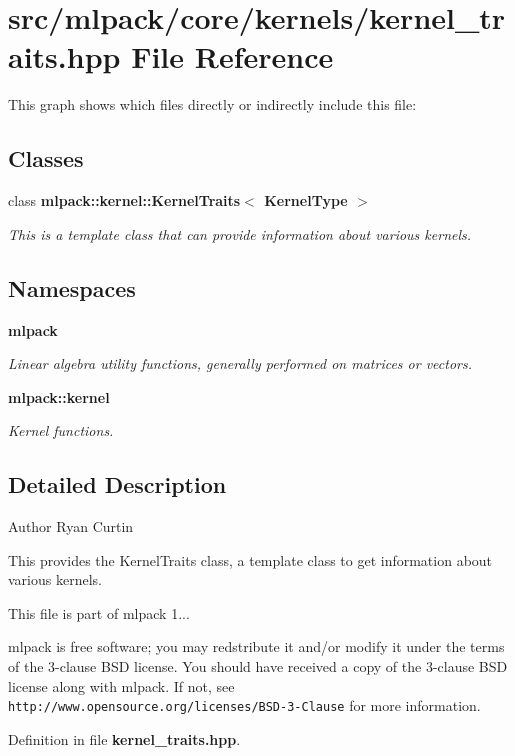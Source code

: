 \section{src/mlpack/core/kernels/kernel\-\_\-traits.hpp File Reference}
\label{kernel__traits_8hpp}
This graph shows which files directly or indirectly include this file\-:
\subsection*{Classes}
\begin{DoxyCompactItemize}
\item 
class {\bf mlpack\-::kernel\-::\-Kernel\-Traits$<$ Kernel\-Type $>$}
\begin{DoxyCompactList}\small\item\em This is a template class that can provide information about various kernels. \end{DoxyCompactList}\end{DoxyCompactItemize}
\subsection*{Namespaces}
\begin{DoxyCompactItemize}
\item 
{\bf mlpack}
\begin{DoxyCompactList}\small\item\em Linear algebra utility functions, generally performed on matrices or vectors. \end{DoxyCompactList}\item 
{\bf mlpack\-::kernel}
\begin{DoxyCompactList}\small\item\em Kernel functions. \end{DoxyCompactList}\end{DoxyCompactItemize}


\subsection{Detailed Description}
\begin{DoxyAuthor}{Author}
Ryan Curtin
\end{DoxyAuthor}
This provides the Kernel\-Traits class, a template class to get information about various kernels.

This file is part of mlpack 1...

mlpack is free software; you may redstribute it and/or modify it under the terms of the 3-\/clause B\-S\-D license. You should have received a copy of the 3-\/clause B\-S\-D license along with mlpack. If not, see {\tt http\-://www.\-opensource.\-org/licenses/\-B\-S\-D-\/3-\/\-Clause} for more information. 

Definition in file {\bf kernel\-\_\-traits.\-hpp}.

